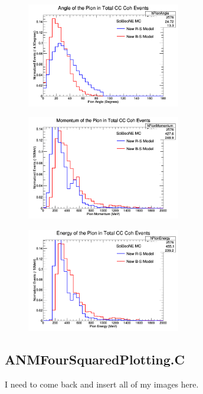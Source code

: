 \documentclass[11pt]{article}
\begin{document}
\begin{figure}[H]
\centering
\includegraphics[width=0.6\textwidth]{ANMPionPlottingImages/10-ANMPionPlotting.png}
\caption{}
\end{figure}

\begin{figure}[H]
\centering
\includegraphics[width=0.6\textwidth]{ANMPionPlottingImages/11-ANMPionPlotting.png}
\caption{}
\end{figure}

\begin{figure}[H]
\centering
\includegraphics[width=0.6\textwidth]{ANMPionPlottingImages/12-ANMPionPlotting.png}
\caption{}
\end{figure}

\subsection{ANMFourSquaredPlotting.C}
I need to come back and insert all of my images here.
\end{document}
